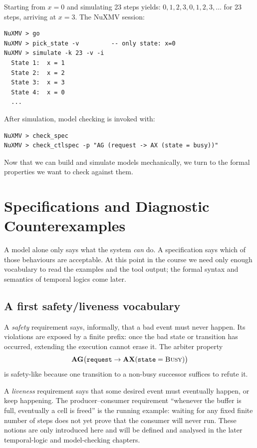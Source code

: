 \begin{example}
\label{ex:nuxmv-mod4}
Starting from $x=0$ and simulating 23 steps yields:
$0,1,2,3,0,1,2,3,\ldots$ for 23 steps, arriving at $x=3$.  The NuXMV
session:
\begin{verbatim}
NuXMV > go
NuXMV > pick_state -v         -- only state: x=0
NuXMV > simulate -k 23 -v -i
  State 1:  x = 1
  State 2:  x = 2
  State 3:  x = 3
  State 4:  x = 0
  ...
\end{verbatim}
\end{example}

After simulation, model checking is invoked with:
\begin{verbatim}
NuXMV > check_spec
NuXMV > check_ctlspec -p "AG (request -> AX (state = busy))"
\end{verbatim}

Now that we can build and simulate models mechanically, we turn to the formal properties we want to check against them.

\section{Specifications and Diagnostic Counterexamples}
\label{sec:counterexamples}

A model alone only says what the system \emph{can} do.  A specification says
which of those behaviours are acceptable.  At this point in the course we
need only enough vocabulary to read the examples and the tool output; the
formal syntax and semantics of temporal logics come later.

\subsection{A first safety/liveness vocabulary}

A \emph{safety} requirement says, informally, that a bad event must never
happen.  Its violations are exposed by a finite prefix: once the bad state or
transition has occurred, extending the execution cannot erase it.  The
arbiter property
\[
  \mathbf{AG}\bigl(\texttt{request}\to
  \mathbf{AX}(\texttt{state}=\textsc{Busy})\bigr)
\]
is safety-like because one transition to a non-busy successor suffices to
refute it.

A \emph{liveness} requirement says that some desired event must eventually
happen, or keep happening.  The producer--consumer requirement ``whenever
the buffer is full, eventually a cell is freed'' is the running example:
waiting for any fixed finite number of steps does not yet prove that the
consumer will never run.  These notions are only introduced here and will be
defined and analysed in the later temporal-logic and model-checking chapters.

